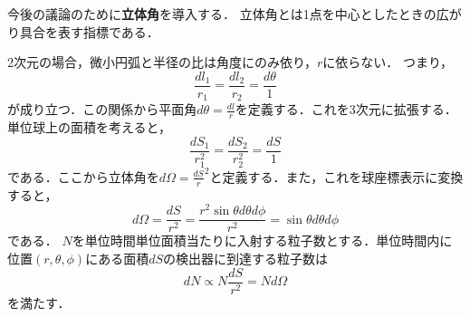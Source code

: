 \documentclass{report}
\begin{document}
今後の議論のために\textbf{立体角}を導入する．
立体角とは1点を中心としたときの広がり具合を表す指標である．

2次元の場合，微小円弧と半径の比は角度にのみ依り，$r$に依らない．
つまり，
\begin{equation}
  \frac{dl_1}{r_1}=\frac{dl_2}{r_2}=\frac{d\theta}{1}
\end{equation}
が成り立つ．この関係から平面角$d\theta=\frac{dl}{r}$を定義する．これを3次元に拡張する．単位球上の面積を考えると，
\begin{equation}
  \frac{dS_1}{r_1^2}=\frac{dS_2}{r_2^2}=\frac{dS}{1}
\end{equation}
である．ここから立体角を$d\Omega=\frac{dS}r^2$と定義する．また，これを球座標表示に変換すると，
\begin{equation}
  d\Omega = \frac{dS}{r^2} = \frac{r^2\sin\theta d\theta d\phi}{r^2} = \sin \theta d\theta d\phi
\end{equation}
である．
  $N$を単位時間単位面積当たりに入射する粒子数とする．単位時間内に位置$(r,\theta,\phi)$にある面積$dS$の検出器に到達する粒子数は
  \begin{equation}
    dN\propto N \frac{dS}{r^2} = N d\Omega
  \end{equation}
  を満たす．
\end{document}
